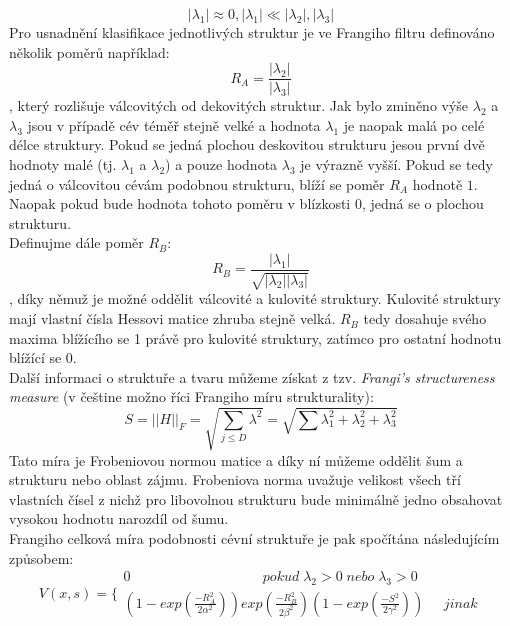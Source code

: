 \documentclass{thesis}%
\begin{document}
\begin{equation}
|\lambda_1| \approx 0, |\lambda_1|\ll |\lambda_2|, |\lambda_3|
\end{equation}
Pro usnadnění klasifikace jednotlivých struktur je ve Frangiho filtru definováno několik poměrů například:
 \begin{equation}
R_A = \frac{|\lambda_2|}{|\lambda_3|}
\end{equation}
, který rozlišuje válcovitých od dekovitých struktur. Jak bylo zminěno výše $ \lambda_2$ a $\lambda_3$ jsou v případě cév téměř stejně velké a hodnota $\lambda_1$ je naopak malá po celé délce struktury. Pokud se jedná plochou deskovitou strukturu jesou první dvě hodnoty malé (tj. $\lambda_1$ a $\lambda_2$) a pouze hodnota $\lambda_3$ je výrazně vyšší. Pokud se tedy jedná o válcovitou cévám podobnou strukturu, blíží se poměr $R_A$ hodnotě $1$. Naopak pokud bude hodnota tohoto poměru v blízkosti $0$, jedná se o plochou strukturu.\\
Definujme dále poměr $R_B$: 
 \begin{equation}
R_B = \frac{|\lambda_1|}{\sqrt{|\lambda_2||\lambda_3|}}
\end{equation}
, díky němuž je možné oddělit válcovité a kulovité struktury. Kulovité struktury mají vlastní čísla Hessovi matice zhruba stejně velká. $R_B$ tedy dosahuje svého maxima blížícího se 1 právě pro kulovité struktury, zatímco pro ostatní hodnotu blížící se 0.\\
Další informaci o struktuře a tvaru můžeme získat z tzv. \textit{Frangi's structureness measure} (v češtine možno říci Frangiho míru strukturality):
 \begin{equation}
S = ||H||_F = \sqrt{\sum_{j\leq D}\lambda^2} = \sqrt{\sum \lambda_1^2 + \lambda_2^2 + \lambda_3^2}
\end{equation}
Tato míra je Frobeniovou normou matice a díky ní můžeme oddělit šum a strukturu nebo oblast zájmu. Frobeniova norma uvažuje velikost všech tří vlastních čísel z nichž pro libovolnou strukturu bude minimálně jedno obsahovat vysokou hodnotu narozdíl od šumu. \\
Frangiho celková míra podobnosti cévní struktuře je pak spočítána následujícím způsobem:
 \begin{equation}\label{Frangiho celková míra}
V(x,s) = \Big\{   \begin{array}{c}
0 \;\;\;\;\;\;\;\;\;\;\;\;\;\;\;\;\;\;\;\;\;\;\;\;\;\;\;\;\;\;\;\;\;\;pokud\; \lambda_2 > 0 \;nebo\; \lambda_3 > 0\\
(1-exp(\frac{-R_A^2}{2\alpha^2}))exp(\frac{-R_B^2}{2\beta^2})(1-exp(\frac{-S^2}{2 \gamma^2}))\;\;\;\;\;jinak
\end{array}\end{equation}
\end{document}
